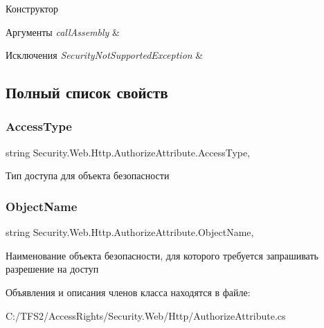 Конструктор 


\begin{DoxyParams}{Аргументы}
{\em call\+Assembly} & \\
\hline
\end{DoxyParams}

\begin{DoxyExceptions}{Исключения}
{\em Security\+Not\+Supported\+Exception} & \\
\hline
\end{DoxyExceptions}


\subsection{Полный список свойств}
\mbox{\label{class_security_1_1_web_1_1_http_1_1_authorize_attribute_a0414cafbcc46d819563bda4be9c6cf64}} 
\subsubsection{\texorpdfstring{Access\+Type}{AccessType}}
{\footnotesize\ttfamily string Security.\+Web.\+Http.\+Authorize\+Attribute.\+Access\+Type\hspace{0.3cm}{\ttfamily [get]}, {\ttfamily [set]}}



Тип доступа для объекта безопасности 

\mbox{\label{class_security_1_1_web_1_1_http_1_1_authorize_attribute_a98f4e1b46077357f34393b648082b39b}} 
\subsubsection{\texorpdfstring{Object\+Name}{ObjectName}}
{\footnotesize\ttfamily string Security.\+Web.\+Http.\+Authorize\+Attribute.\+Object\+Name\hspace{0.3cm}{\ttfamily [get]}, {\ttfamily [set]}}



Наименование объекта безопасности, для которого требуется запрашивать разрешение на доступ 



Объявления и описания членов класса находятся в файле\+:\begin{DoxyCompactItemize}
\item 
C\+:/\+T\+F\+S2/\+Access\+Rights/\+Security.\+Web/\+Http/Authorize\+Attribute.\+cs\end{DoxyCompactItemize}
